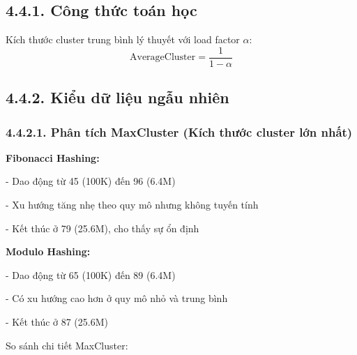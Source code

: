 \documentclass[12pt,a4paper]{report}
\begin{document}
\subsection*{4.4.1. Công thức toán học}
\noindent \indent Kích thước cluster trung bình lý thuyết với load factor $\alpha$:
\begin{equation}
\text{AverageCluster} = \frac{1}{1-\alpha}
\end{equation}

\subsection*{4.4.2. Kiểu dữ liệu ngẫu nhiên}
\subsubsection*{4.4.2.1. Phân tích MaxCluster (Kích thước cluster lớn nhất)}
\noindent \indent \textbf{Fibonacci Hashing:}

    - Dao động từ 45 (100K) đến 96 (6.4M)
    
    - Xu hướng tăng nhẹ theo quy mô nhưng không tuyến tính
    
    - Kết thúc ở 79 (25.6M), cho thấy sự ổn định

\textbf{Modulo Hashing:}

    - Dao động từ 65 (100K) đến 89 (6.4M)
    
    - Có xu hướng cao hơn ở quy mô nhỏ và trung bình
    
    - Kết thúc ở 87 (25.6M)

So sánh chi tiết MaxCluster:
\end{document}
